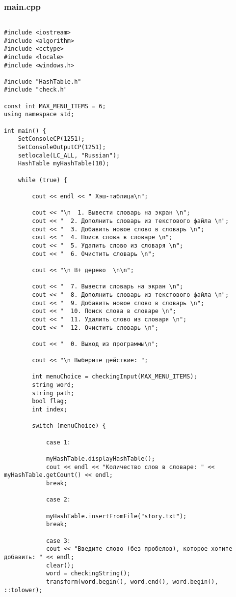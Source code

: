 \documentclass[11pt,a4paper,final]{article} %
\begin{document}
\subsubsection*{main.cpp}
\begin{lstlisting}

#include <iostream>
#include <algorithm>
#include <cctype> 
#include <locale>
#include <windows.h>

#include "HashTable.h"
#include "check.h"

const int MAX_MENU_ITEMS = 6;
using namespace std;

int main() {
	SetConsoleCP(1251);
	SetConsoleOutputCP(1251);
	setlocale(LC_ALL, "Russian");
	HashTable myHashTable(10);
	
	while (true) {
		
		cout << endl << " Хэш-таблица\n";
		
		cout << "\n  1. Вывести словарь на экран \n";
		cout << "  2. Дополнить словарь из текстового файла \n";
		cout << "  3. Добавить новое слово в словарь \n";
		cout << "  4. Поиск слова в словаре \n";
		cout << "  5. Удалить слово из словаря \n";
		cout << "  6. Очистить словарь \n";
		
		cout << "\n B+ дерево  \n\n";
		
		cout << "  7. Вывести словарь на экран \n";
		cout << "  8. Дополнить словарь из текстового файла \n";
		cout << "  9. Добавить новое слово в словарь \n";
		cout << "  10. Поиск слова в словаре \n";
		cout << "  11. Удалить слово из словаря \n";
		cout << "  12. Очистить словарь \n";
		
		cout << "  0. Выход из программы\n";
		
		cout << "\n Выберите действие: ";
		
		int menuChoice = checkingInput(MAX_MENU_ITEMS);
		string word;
		string path;
		bool flag;
		int index;
		
		switch (menuChoice) {
			
			case 1:
			
			myHashTable.displayHashTable();
			cout << endl << "Количество слов в словаре: " << myHashTable.getCount() << endl;
			break;
			
			case 2:
			
			myHashTable.insertFromFile("story.txt");
			break;
			
			case 3:
			cout << "Введите слово (без пробелов), которое хотите добавить: " << endl;
			clear();
			word = checkingString();
			transform(word.begin(), word.end(), word.begin(), ::tolower);
			

\end{lstlisting}
\end{document}

